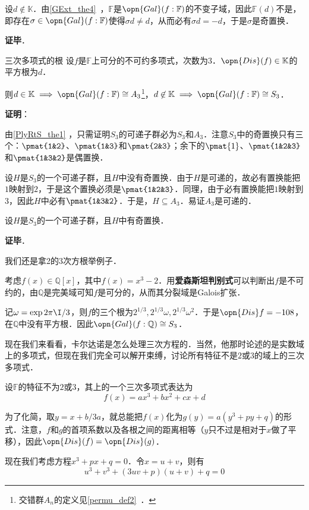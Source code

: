 设$d\not\in\mathbb{K}$．由\autoref{GExt_the4}~，$\mathbb{F}$是$\opn{Gal}(f:\mathbb{F})$的不变子域，因此$\mathbb{F}(d)$不是，即存在$\sigma\in\opn{Gal}(f:\mathbb{F})$使得$\sigma d\neq d$，从而必有$\sigma d= -d$，于是$\sigma$是奇置换．

\textbf{证毕}．


\begin{corollary}{三次多项式的根}
设$f$是$\mathbb{F}$上可分的不可约多项式，次数为$3$．$\opn{Dis}(f)\in\mathbb{K}$的平方根为$d$．

则$d\in\mathbb{K}\implies\opn{Gal}(f:\mathbb{F})\cong A_3$\footnote{交错群$A_n$的定义见\autoref{permu_def2}~．}，$d\not\in\mathbb{K}\implies\opn{Gal}(f:\mathbb{F})\cong S_3$．
\end{corollary}

\textbf{证明}：

由\autoref{PlyRtS_the1} ，只需证明$S_3$的可递子群必为$S_3$和$A_3$．注意$S_3$中的奇置换只有三个：$\pmat{1&2}$、$\pmat{1&3}$和$\pmat{2&3}$；余下的$\pmat{1}$、$\pmat{1&2&3}$和$\pmat{1&3&2}$是偶置换．

设$H$是$S_3$的一个可递子群，且$H$中没有奇置换．由于$H$是可递的，故必有置换能把$1$映射到$2$，于是这个置换必须是$\pmat{1&2&3}$．同理，由于必有置换能把$1$映射到$3$，因此$H$中必有$\pmat{1&3&2}$．于是，$H\subseteq A_3$．易证$A_3$是可递的．

设$H$是$S_3$的一个可递子群，且$H$中有奇置换．

\textbf{证毕}．

\begin{example}{}
我们还是拿2的3次方根举例子．

考虑$f(x)\in\mathbb{Q}[x]$，其中$f(x)=x^3-2$．用\textbf{爱森斯坦判别式}可以判断出$f$是不可约的，由$\mathbb{Q}$是完美域可知$f$是可分的，从而其分裂域是Galois扩张．

记$\omega=\exp{2\pi\I/3}$，则$f$的三个根为$2^{1/3}, 2^{1/3}\omega, 2^{1/3}\omega^2$．于是$\opn{Dis}f=-108$，在$\mathbb{Q}$中没有平方根．因此$\opn{Gal}(f:\mathbb{Q})\cong S_3$．
\end{example}


现在我们来看看，卡尔达诺是怎么处理三次方程的．当然，他那时论述的是实数域上的多项式，但现在我们完全可以解开束缚，讨论所有特征不是$2$或$3$的域上的三次多项式．

设$\mathbb{F}$的特征不为$2$或$3$，其上的一个三次多项式表达为
\begin{equation}
f(x) = ax^3+bx^2+cx+d
\end{equation}

为了化简，取$y=x+b/3a$，就总能把$f(x)$化为$g(y)=a(y^3+py+q)$的形式．注意，$f$和$g$的首项系数以及各根之间的距离相等（$y$只不过是相对于$x$做了平移），因此$\opn{Dis}(f)=\opn{Dis}(g)$．

现在我们考虑方程$x^3+px+q=0$．令$x=u+v$，则有
\begin{equation}
u^3+v^3+(3uv+p)(u+v)+q=0
\end{equation}





























